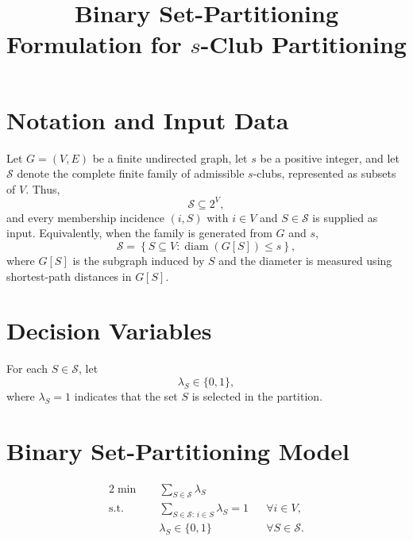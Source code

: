 \documentclass[11pt]{article}
\title{Binary Set-Partitioning Formulation for $s$-Club Partitioning}
\author{}
\date{}
\begin{document}
\maketitle

\section*{Notation and Input Data}

Let $G=(V,E)$ be a finite undirected graph, let $s$ be a positive integer, and let
$\mathcal{S}$ denote the complete finite family of admissible $s$-clubs, represented as
subsets of $V$. Thus,
\[
\mathcal{S}\subseteq 2^V,
\]
and every membership incidence $(i,S)$ with $i\in V$ and $S\in\mathcal{S}$ is supplied as input. Equivalently, when the family is generated from $G$ and $s$,
\[
\mathcal{S}
=
\left\{S\subseteq V:\operatorname{diam}(G[S])\le s\right\},
\]
where $G[S]$ is the subgraph induced by $S$ and the diameter is measured using shortest-path distances in $G[S]$.

\section*{Decision Variables}

For each $S\in\mathcal{S}$, let
\[
\lambda_S\in\{0,1\},
\]
where $\lambda_S=1$ indicates that the set $S$ is selected in the partition.

\section*{Binary Set-Partitioning Model}

\begin{alignat}{2}
\min\quad & \sum_{S\in\mathcal{S}}\lambda_S && \tag{2a}\\
\text{s.t.}\quad
& \sum_{S\in\mathcal{S}:\,i\in S}\lambda_S = 1
&& \forall i\in V, \tag{2b}\\
& \lambda_S\in\{0,1\}
&& \forall S\in\mathcal{S}. \tag{2c}
\end{alignat}
\end{document}
